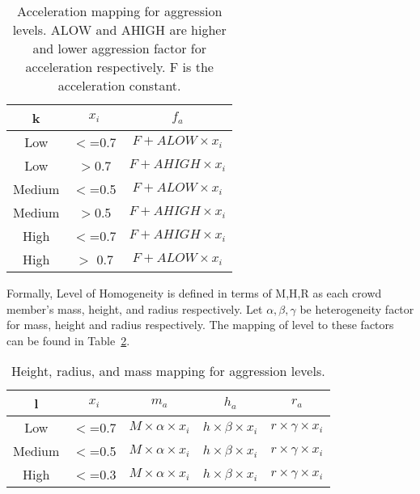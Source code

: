 \begin{table}
\centering
	\begin{tabular}{||c c c ||} 
	\hline
	k & $x_{i}$ & $f_{a}$\\ [0.5ex] 
	\hline\hline
	Low & $<$=0.7 & $F+ ALOW\times x_{i}$ \\ 
	\hline
	Low & $>$0.7 & $ F+ AHIGH\times x_{i} $\\
	\hline
	Medium & $<$=0.5 & $F+ ALOW\times x_{i}$ \\
	\hline
	Medium & $>$0.5 & $F+ AHIGH\times x_{i}$\\
	\hline
	High & $<$=0.7 & $F+ AHIGH\times x_{i} $\\
	\hline
	High & $>$ 0.7 & $F+ ALOW\times x_{i}$\\
	\hline
	\end{tabular}
	\caption{\label{table:aggression-levels-accels} Acceleration mapping for aggression levels. ALOW and AHIGH are higher and lower aggression factor for acceleration respectively. F is the acceleration constant.}
\end{table}

Formally, Level of Homogeneity is defined in terms of M,H,R as each crowd member's mass, height, and radius respectively. 
Let $ \alpha , \beta, \gamma $ be heterogeneity factor for mass, height and radius respectively.  The mapping of level to these factors can be found in Table~\ref{table:homogeneity-levels}.

\begin{table}
\centering
	\begin{tabular}{||c c c c c||} 
	\hline
	l & $x_{i}$ & $m_{a}$ & $h_{a}$ & $r_{a}$\\ [0.5ex] 
	\hline\hline
	Low & $<$=0.7 & $M\times \alpha \times x_{i} $ & $h\times \beta \times x_{i}$ & $r\times \gamma \times x_{i} $ \\ 
	\hline
	Medium & $<$=0.5 & $ M\times \alpha \times x_{i}$ & $h\times \beta \times x_{i}$ & $r\times \gamma \times x_{i}$\\
	\hline
	High & $<$=0.3 & $M\times \alpha \times x_{i}$ & $h\times \beta \times x_{i} $ & $r\times \gamma \times x_{i} $\\
	\hline
	\end{tabular}
	\caption{\label{table:homogeneity-levels} Height, radius, and mass mapping for aggression levels.}
\end{table}